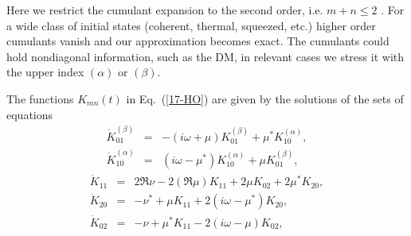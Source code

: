 \documentclass[12pt,twoside,a4paper]{report}
\begin{document}
Here we restrict the cumulant expansion to the second order, i.e.
$m+n \le 2$
.
For a wide class of initial states
(coherent, thermal, squeezed, etc.) higher order cumulants
vanish and our approximation becomes exact.
The cumulants
could hold  nondiagonal information,
such as the DM, in relevant cases we stress it
with the upper index $ (\alpha) $ or $ (\beta) $. 

The functions
$K_{mn}(t)$ in Eq.~(\ref{17-HO}) are given by the
solutions of the sets of equations
\begin{eqnarray}
      \dot{K}_{01}^{(\beta )} 
             &=& -  \left( 
                        {{i}}\omega +  \mu 
                     \right) K_{01}^{(\beta)}
                                                     +  \mu^{*}
                                                       K_{10}^{(\alpha)},        
\nonumber \\ 
      \dot{K}_{10}^{(\alpha )} 
             &=&     \left( 
                         {{i}}\omega - \mu ^{*}
                     \right) K_{10}^{(\alpha)}
                                                    +  \mu
                                                      K_{01}^{(\beta)},
\label{18-HO}
\end{eqnarray}
\begin{eqnarray}
  \dot{K}_{11} 
        &=&  2\Re\nu
             -2 \left( \Re\mu \right) 
                        K_{11}
             +2 \mu     K_{02}
             +2 \mu^{*} K_{20}
, \nonumber \\
  \dot{K}_{20} 
        &=& -  \nu^{*}+\mu K_{11}
            +2 \left( 
                  {{i}}\omega - \mu^{*}
               \right) K_{20}, \label{19-HO} \\
  \dot{K}_{02} 
        &=&  - \nu 
              + \mu^{*} K_{11}
             - 2 \left( 
                   {{i}}\omega - \mu 
                \right) K_{02}, \nonumber
\end{eqnarray}
\end{document}
